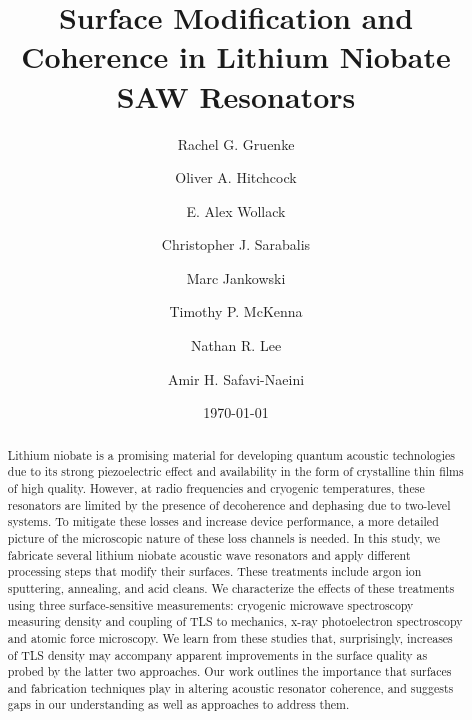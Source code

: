 \documentclass[
 prapplied,
 amsmath,amssymb,
 reprint, longbibliography, superscriptaddress
]{revtex4-2}
\begin{document}

\title[Surface Modification and Coherence in Lithium Niobate SAW Resonators]{Surface Modification and Coherence in Lithium Niobate SAW Resonators}

\author{Rachel G. Gruenke}
\author{Oliver A. Hitchcock}
\author{E. Alex Wollack}

\author{Christopher J. Sarabalis}

\author{Marc Jankowski}
\author{Timothy P. McKenna}

\author{Nathan R. Lee}
\author{Amir H. Safavi-Naeini}

\date{\today}

\begin{abstract}
Lithium niobate is a promising material for developing quantum acoustic technologies due to its strong piezoelectric effect and availability in the form of crystalline thin films of high quality. However, at radio frequencies and cryogenic temperatures, these resonators are limited by the presence of decoherence and dephasing due to two-level systems. To mitigate these losses and increase device performance, a more detailed picture of the microscopic nature of these loss channels is needed. In this study, we fabricate several lithium niobate acoustic wave resonators and apply different processing steps that modify their surfaces. These treatments include argon ion sputtering, annealing, and acid cleans. We characterize the effects of these treatments using three surface-sensitive measurements: cryogenic microwave spectroscopy measuring density and coupling of TLS to mechanics, x-ray photoelectron spectroscopy and atomic force microscopy. We learn from these studies that, surprisingly, increases of TLS density may accompany apparent improvements in the surface quality as probed by the latter two approaches. Our work outlines the importance that surfaces and fabrication techniques play in altering acoustic resonator coherence, and suggests gaps in our understanding as well as approaches to address them.  
\end{abstract}
\end{document}
